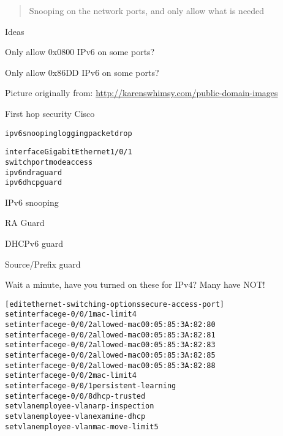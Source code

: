 \documentclass[Screen16to9,17pt]{foils}
\begin{document}


\begin{quote}
Snooping on the network ports, and only allow what is needed
\end{quote}

Ideas
\begin{list2}
\item Only allow 0x0800 IPv6 on some ports?
\item Only allow 0x86DD IPv6 on some ports?
\end{list2}



\centerline{Picture originally from: \url{http://karenswhimsy.com/public-domain-images}}




First hop security Cisco
\begin{alltt}
ipv6 snooping logging packet drop

interface GigabitEthernet1/0/1
    switchport mode access
    ipv6 nd raguard
    ipv6 dhcp guard
\end{alltt}

\begin{list2}
\item IPv6 snooping
\item RA Guard
\item DHCPv6 guard
\item Source/Prefix guard
\end{list2}

Wait a minute, have you turned on these for IPv4? Many have NOT!


\begin{alltt}\small
[edit ethernet-switching-options secure-access-port]
set interface ge-0/0/1 mac-limit 4
set interface ge-0/0/2 allowed-mac 00:05:85:3A:82:80
set interface ge-0/0/2 allowed-mac 00:05:85:3A:82:81
set interface ge-0/0/2 allowed-mac 00:05:85:3A:82:83
set interface ge-0/0/2 allowed-mac 00:05:85:3A:82:85
set interface ge-0/0/2 allowed-mac 00:05:85:3A:82:88
set interface ge-0/0/2 mac-limit 4
set interface ge-0/0/1 persistent-learning
set interface ge-0/0/8 dhcp-trusted
set vlan employee-vlan arp-inspection
set vlan employee-vlan examine-dhcp
set vlan employee-vlan mac-move-limit 5
\end{alltt}
\end{document}
